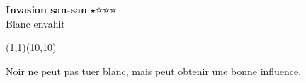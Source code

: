 \documentclass[preview, border=0pt, varwidth=false]{standalone}
\begin{document}
	\setgounit{0.6cm} 
	
\parbox[c][14.65cm][c]{10.2cm}{
	\centering
	
	{\Large\textbf{Invasion san-san} $\medblackstar \medwhitestar \medwhitestar \medwhitestar$ \\ Blanc envahit}
	\vspace{3em}
	
	\begin{psgopartialboard}{(1,1)(10,10)}
		\pass
	\end{psgopartialboard}
	
	\vspace{1em}
	Noir ne peut pas tuer blanc, mais peut obtenir une bonne influence.
}
\end{document}
